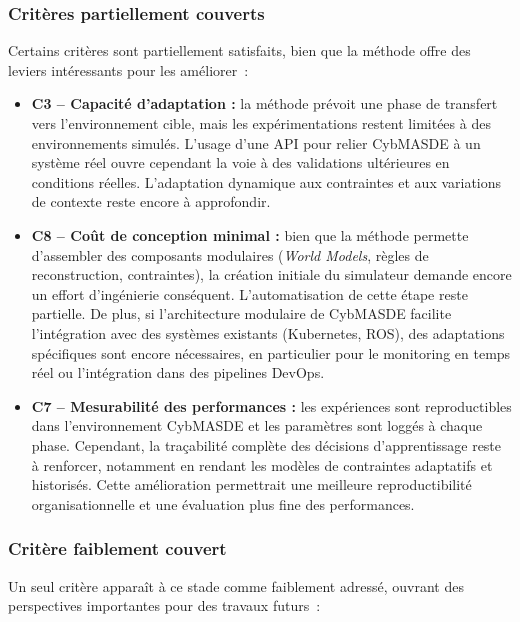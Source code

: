 \subsubsection*{Critères partiellement couverts}

Certains critères sont partiellement satisfaits, bien que la méthode offre des leviers intéressants pour les améliorer~:

\begin{itemize}
    \item \textbf{C3 – Capacité d’adaptation :} la méthode prévoit une phase de transfert vers l’environnement cible, mais les expérimentations restent limitées à des environnements simulés. L’usage d’une API pour relier CybMASDE à un système réel ouvre cependant la voie à des validations ultérieures en conditions réelles. L’adaptation dynamique aux contraintes et aux variations de contexte reste encore à approfondir.

    \item \textbf{C8 – Coût de conception minimal :} bien que la méthode permette d’assembler des composants modulaires (\textit{World Models}, règles de reconstruction, contraintes), la création initiale du simulateur demande encore un effort d’ingénierie conséquent. L’automatisation de cette étape reste partielle. De plus, si l’architecture modulaire de CybMASDE facilite l’intégration avec des systèmes existants (Kubernetes, ROS), des adaptations spécifiques sont encore nécessaires, en particulier pour le monitoring en temps réel ou l’intégration dans des pipelines DevOps.

    \item \textbf{C7 – Mesurabilité des performances :} les expériences sont reproductibles dans l’environnement CybMASDE et les paramètres sont loggés à chaque phase. Cependant, la traçabilité complète des décisions d’apprentissage reste à renforcer, notamment en rendant les modèles de contraintes adaptatifs et historisés. Cette amélioration permettrait une meilleure reproductibilité organisationnelle et une évaluation plus fine des performances.
\end{itemize}

\subsubsection*{Critère faiblement couvert}

Un seul critère apparaît à ce stade comme faiblement adressé, ouvrant des perspectives importantes pour des travaux futurs~:

